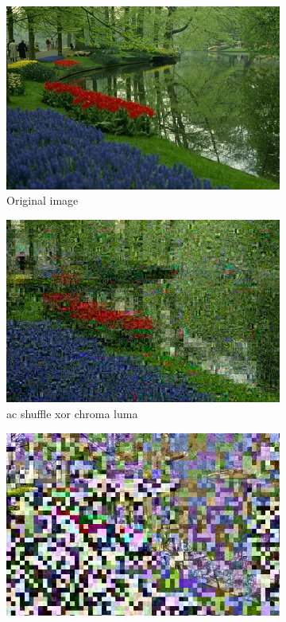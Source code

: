 \documentclass{article}
\begin{document}
\begin{figure}[ht]
\centering
\begin{subfigure}{4.3cm}
  \centering
  \includegraphics[width=0.9\linewidth]{figures/140055}
  \caption{Original image}
  \label{fig:sub1}
\end{subfigure}%
\begin{subfigure}{4.3cm}
  \centering
  \includegraphics[width=0.9\linewidth]{figures/ac_shuffle_xor_chrominance_luminance_76_140055}
  \caption{ac shuffle xor chroma luma}
  \label{fig:sub2}
\end{subfigure}
\begin{subfigure}{4.3cm}
  \centering
  \includegraphics[width=0.9\linewidth]{figures/dc_xor_chrominance_luminance_76_140055}

\end{subfigure}
\end{figure}
\end{document}

